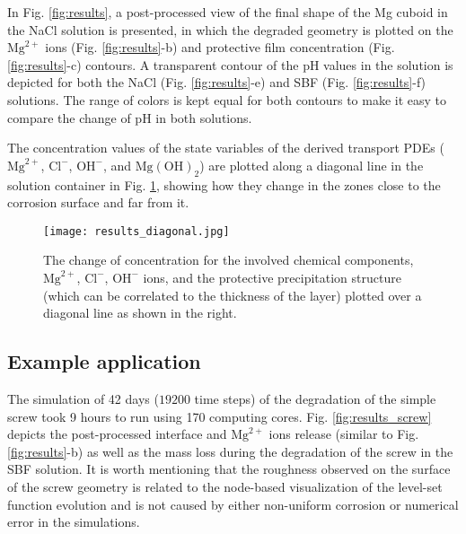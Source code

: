 In Fig. \ref{fig:results}, a post-processed view of the final shape of the Mg cuboid in the NaCl solution is presented, in which the degraded geometry is plotted on the $\mathrm{Mg}^{2+}$ ions (Fig. \ref{fig:results}-b) and protective film concentration (Fig. \ref{fig:results}-c) contours. A transparent contour of the pH values in the solution is depicted for both the NaCl (Fig. \ref{fig:results}-e) and {SBF} (Fig. \ref{fig:results}-f) solutions. The range of colors is kept equal for both contours to make it easy to compare the change of pH in both solutions.


The concentration values of the state variables of the derived transport {PDE}s ($\mathrm{Mg}^{2+}$, $\mathrm{Cl}^{-}$, $\mathrm{OH}^{-}$, and $\mathrm{Mg(OH)}_2$) are plotted along a diagonal line in the solution container in Fig. \ref{fig:results_diagonal}, showing how they change in the zones close to the corrosion surface and far from it. %


\begin{figure}[t]
\centering
\medskip
\texttt{[image: results\_diagonal.jpg]}
\caption[Change of concentration of various chemical components over a line]{The change of concentration for the involved chemical components, $\mathrm{Mg}^{2+}$, $\mathrm{Cl}^{-}$, $\mathrm{OH}^{-}$ ions, and the protective precipitation structure (which can be correlated to the thickness of the layer) plotted over a diagonal line as shown in the right.} \label{fig:results_diagonal}
\end{figure}

\subsection{Example application}

The simulation of 42 days ($\num{19200}$ time steps) of the degradation of the simple screw took 9 hours to run using 170 computing cores. Fig. \ref{fig:results_screw} depicts the post-processed interface and $\mathrm{Mg}^{2+}$ ions release (similar to Fig. \ref{fig:results}-b) as well as the mass loss during the degradation of the screw in the {SBF} solution. It is worth mentioning that the roughness observed on the surface of the screw geometry is related to the node-based visualization of the level-set function evolution and is not caused by either non-uniform corrosion or numerical error in the simulations.

